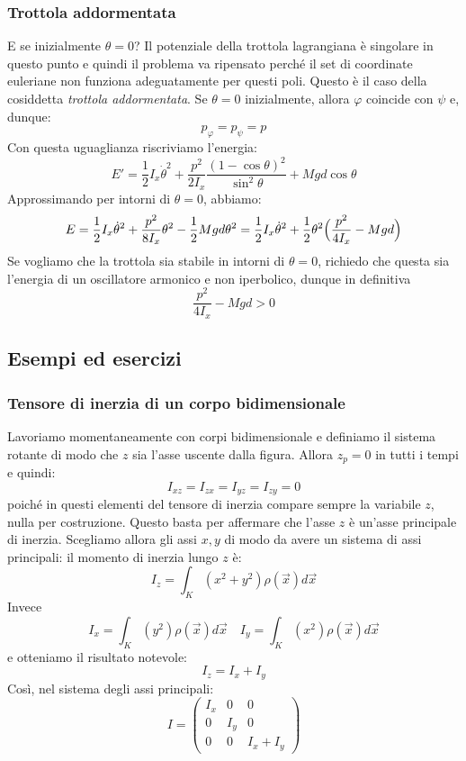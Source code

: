 \documentclass[a4paper,openany]{article}
\begin{document}
	\subsubsection{Trottola addormentata}
	E se inizialmente $\theta = 0$? Il potenziale della trottola lagrangiana è singolare in questo punto e quindi il problema va ripensato perché il set di coordinate euleriane non funziona adeguatamente per questi poli. Questo è il caso della cosiddetta \textit{trottola addormentata}. Se $\theta=0$ inizialmente, allora $\varphi$ coincide con $\psi$ e, dunque:
	$$
	p_{\varphi} = p_\psi = p
	$$
	Con questa uguaglianza riscriviamo l'energia:
	$$
	E' = \dfrac{1}{2}I_x\dot{\theta}^2 + \dfrac{p^2}{2I_x}\dfrac{(1-\cos\theta)^2}{\sin^2\theta}+  Mgd\cos\theta
	$$
	Approssimando per intorni di $\theta=0$, abbiamo:
	$$
	E = \dfrac{1}{2}I_x\dot{\theta}^2 + \dfrac{p^2}{8I_x}\theta^2-\dfrac{1}{2}Mgd\theta^2 =\dfrac{1}{2}I_x\dot{\theta}^2 + \dfrac{1}{2}\theta^2\Bigl(\dfrac{p^2}{4I_x}-Mgd\Bigl)
	$$
	Se vogliamo che la trottola sia stabile in intorni di $\theta=0$, richiedo che questa sia l'energia di un oscillatore armonico e non iperbolico, dunque in definitiva
	\begin{equation}\label{key}
		\dfrac{p^2}{4I_x}-Mgd > 0
	\end{equation}
    
	\newpage 
	\subsection{Esempi ed esercizi}
	\subsubsection{Tensore di inerzia di un corpo bidimensionale}
	Lavoriamo momentaneamente con corpi bidimensionale e definiamo il sistema rotante di modo che $z$ sia l'asse uscente dalla figura. Allora $z_{p} = 0$ in tutti i tempi e quindi:
	$$
	I_{xz} = I_{zx} = I_{yz} = I_{zy} = 0
	$$  
	poiché in questi elementi del tensore di inerzia compare sempre la variabile $z$, nulla per costruzione. Questo basta per affermare che l'asse $z$ è un'asse principale di inerzia. Scegliamo allora gli assi $x,y$ di modo da avere un sistema di assi principali: il momento di inerzia lungo $z$ è:
	$$
	I_{z} = \int_{K}(x^2+y^2)\rho(\vec{x}) d\vec{x}
	$$
	Invece 
	$$
	I_{x} = \int_{K}(y^2)\rho(\vec{x}) d\vec{x} \quad I_{y} = \int_{K}(x^2)\rho(\vec{x}) d\vec{x}
	$$
	e otteniamo il risultato notevole:
	\begin{equation}\label{key}
		I_z = I_x + I_y
	\end{equation}
	Così, nel sistema degli assi principali:
	\begin{equation}\label{key}
		I = 
		\begin{pmatrix}
			I_x & 0 & 0 \\
			0 & I_y & 0 \\
			0 & 0 & I_x + I_y
		\end{pmatrix}
	\end{equation}
\end{document}
